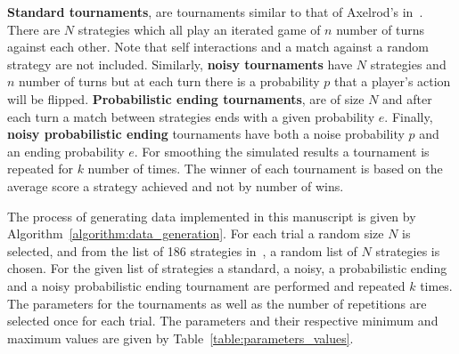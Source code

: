 \documentclass{article}
\begin{document}
\textbf{Standard tournaments}, are tournaments similar to that of Axelrod's
in~\cite{Axelrod1980a}. There are \(N\) strategies which all play an iterated
game of \(n\) number of turns against each other. Note that self interactions
and a match against a random strategy are not included. Similarly, \textbf{noisy
tournaments} have \(N\) strategies and \(n\) number of turns but at each turn
there is a probability \(p\) that a player's action will be flipped.
\textbf{Probabilistic ending tournaments}, are of size \(N\) and after each turn
a match between strategies ends with a given probability \(e\). Finally,
\textbf{noisy probabilistic ending} tournaments have both a noise probability
\(p\) and an ending probability \(e\). For smoothing the simulated results a
tournament is repeated for \(k\) number of times. The winner of each tournament
is based on the average score a strategy achieved and not by number of wins.



The process of generating data implemented in this manuscript is given by
Algorithm~\ref{algorithm:data_generation}. For each trial a random
size \(N\) is selected, and from the list of 186 strategies
in~\cite{axelrodproject}, a random list of \(N\) strategies is chosen. For the
given list of strategies a standard, a noisy, a probabilistic ending and a noisy
probabilistic ending tournament are performed and repeated \(k\) times.
The parameters for the tournaments as well as the number of repetitions are
selected once for each trial. The parameters and their respective minimum and
maximum values are given by Table~\ref{table:parameters_values}.
\end{document}
